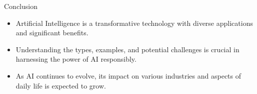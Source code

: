 \begin{frame}{Conclusion}
  \begin{itemize}
    \item Artificial Intelligence is a transformative technology with diverse applications and significant benefits.
    \item Understanding the types, examples, and potential challenges is crucial in harnessing the power of AI responsibly.
    \item As AI continues to evolve, its impact on various industries and aspects of daily life is expected to grow.
  \end{itemize}
\end{frame}
